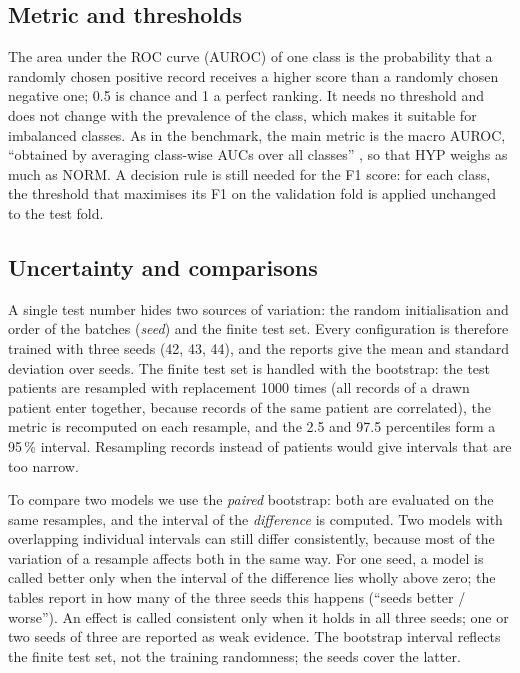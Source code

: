 \subsection{Metric and thresholds}

The area under the ROC curve (AUROC) of one class is the probability that a randomly chosen positive
record receives a higher score than a randomly chosen negative one; 0.5 is chance and 1 a perfect
ranking. It needs no threshold and does not change with the prevalence of the class, which makes it
suitable for imbalanced classes. As in the benchmark, the main metric is the macro AUROC, ``obtained
by averaging class-wise AUCs over all classes'' \cite[p.~1522]{strodthoff2021deep}, so that HYP
weighs as much as NORM. A decision rule is still needed for the F1 score: for each class, the
threshold that maximises its F1 on the validation fold is applied unchanged to the test fold.

\subsection{Uncertainty and comparisons}

A single test number hides two sources of variation: the random initialisation and order of the
batches (\emph{seed}) and the finite test set. Every configuration is therefore trained with three
seeds (42, 43, 44), and the reports give the mean and standard deviation over seeds. The finite test
set is handled with the bootstrap: the test patients are resampled with replacement 1000 times
(all records of a drawn patient enter together, because records of the same patient are correlated),
the metric is recomputed on each resample, and the 2.5 and 97.5 percentiles form a 95\,\% interval.
Resampling records instead of patients would give intervals that are too narrow.

To compare two models we use the \emph{paired} bootstrap: both are evaluated on the same resamples,
and the interval of the \emph{difference} is computed. Two models with overlapping individual intervals
can still differ consistently, because most of the variation of a resample affects both in the same
way. For one seed, a model is called better only when the interval of the difference lies wholly above
zero; the tables report in how many of the three seeds this happens (``seeds better / worse''). An effect
is called consistent only when it holds in all three seeds; one or two seeds of three are reported as weak
evidence. The bootstrap interval reflects the finite test set, not the training randomness; the seeds
cover the latter.

